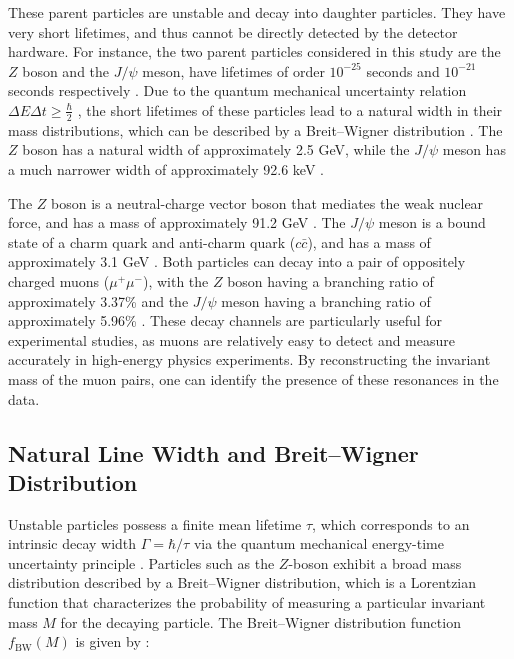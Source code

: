 \documentclass[11pt, a4paper]{article}
\numberwithin{equation}{section}
\begin{document}
These parent particles are unstable and decay into daughter particles. They have very short lifetimes, and thus cannot be directly detected by the detector hardware. For instance, the two parent particles considered in this study are the $Z$ boson and the $J/\psi$ meson, have lifetimes of order $10^{-25}$ seconds and $10^{-21}$ seconds respectively \cite{pdgnavas2024review}. 
Due to the quantum mechanical uncertainty relation $\Delta E \Delta t \geq \frac{\hbar}{2}$ \cite{wigner1997quantummechanics}, the short lifetimes of these particles lead to a natural width in their mass distributions, which can be described by a Breit--Wigner distribution \cite{pdgtakahashizboson2026review}. The $Z$ boson has a natural width of approximately 2.5 GeV, while the $J/\psi$ meson has a much narrower width of approximately 92.6 keV \cite{pdgtakahashijpsi2026review}.

The $Z$ boson is a neutral-charge vector boson that mediates the weak nuclear force, and has a mass of approximately 91.2 GeV \cite{pdgtakahashizboson2026review}. The $J/\psi$ meson is a bound state of a charm quark and anti-charm quark ($c\bar{c}$), and has a mass of approximately 3.1 GeV \cite{pdgtakahashijpsi2026review}. Both particles can decay into a pair of oppositely charged muons ($\mu^+ \mu^-$), with the $Z$ boson having a branching ratio of approximately 3.37\% and the $J/\psi$ meson having a branching ratio of approximately 5.96\% \cite{pdgtakahashizboson2026review, pdgtakahashijpsi2026review}. These decay channels are particularly useful for experimental studies, as muons are relatively easy to detect and measure accurately in high-energy physics experiments. By reconstructing the invariant mass of the muon pairs, one can identify the presence of these resonances in the data.

\subsection{Natural Line Width and Breit--Wigner Distribution}

Unstable particles possess a finite mean lifetime $\tau$, which corresponds to an intrinsic decay width $\Gamma = \hbar / \tau$ via the quantum mechanical energy-time uncertainty principle \cite{wigner1997quantummechanics}. Particles such as the $Z$-boson exhibit a broad mass distribution described by a Breit--Wigner distribution, which is a Lorentzian function that characterizes the probability of measuring a particular invariant mass $M$ for the decaying particle. The Breit--Wigner distribution function $f_{\text{BW}}(M)$ is given by \cite{breitwigner1936slowneutrons}:
\end{document}

